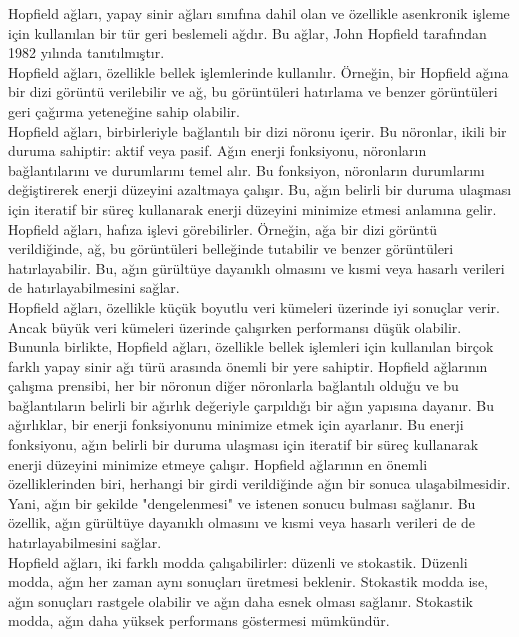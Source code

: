 \documentclass[11pt]{article}
\begin{document}
Hopfield ağları, yapay sinir ağları sınıfına dahil olan ve özellikle asenkronik işleme için kullanılan bir tür geri beslemeli ağdır. Bu ağlar, John Hopfield tarafından 1982 yılında tanıtılmıştır.\\
Hopfield ağları, özellikle bellek işlemlerinde kullanılır. Örneğin, bir Hopfield ağına bir dizi görüntü verilebilir ve ağ, bu görüntüleri hatırlama ve benzer görüntüleri geri çağırma yeteneğine sahip olabilir.\\
Hopfield ağları, birbirleriyle bağlantılı bir dizi nöronu içerir. Bu nöronlar, ikili bir duruma sahiptir: aktif veya pasif. Ağın enerji fonksiyonu, nöronların bağlantılarını ve durumlarını temel alır. Bu fonksiyon, nöronların durumlarını değiştirerek enerji düzeyini azaltmaya çalışır. Bu, ağın belirli bir duruma ulaşması için iteratif bir süreç kullanarak enerji düzeyini minimize etmesi anlamına gelir.\\
Hopfield ağları, hafıza işlevi görebilirler. Örneğin, ağa bir dizi görüntü verildiğinde, ağ, bu görüntüleri belleğinde tutabilir ve benzer görüntüleri hatırlayabilir. Bu, ağın gürültüye dayanıklı olmasını ve kısmi veya hasarlı verileri de hatırlayabilmesini sağlar.\\
Hopfield ağları, özellikle küçük boyutlu veri kümeleri üzerinde iyi sonuçlar verir. Ancak büyük veri kümeleri üzerinde çalışırken performansı düşük olabilir. Bununla birlikte, Hopfield ağları, özellikle bellek işlemleri için kullanılan birçok farklı yapay sinir ağı türü arasında önemli bir yere sahiptir.
Hopfield ağlarının çalışma prensibi, her bir nöronun diğer nöronlarla bağlantılı olduğu ve bu bağlantıların belirli bir ağırlık değeriyle çarpıldığı bir ağın yapısına dayanır. Bu ağırlıklar, bir enerji fonksiyonunu minimize etmek için ayarlanır. Bu enerji fonksiyonu, ağın belirli bir duruma ulaşması için iteratif bir süreç kullanarak enerji düzeyini minimize etmeye çalışır.
Hopfield ağlarının en önemli özelliklerinden biri, herhangi bir girdi verildiğinde ağın bir sonuca ulaşabilmesidir. Yani, ağın bir şekilde "dengelenmesi" ve istenen sonucu bulması sağlanır. Bu özellik, ağın gürültüye dayanıklı olmasını ve kısmi veya hasarlı verileri de de hatırlayabilmesini sağlar.\\
Hopfield ağları, iki farklı modda çalışabilirler: düzenli ve stokastik. Düzenli modda, ağın her zaman aynı sonuçları üretmesi beklenir. Stokastik modda ise, ağın sonuçları rastgele olabilir ve ağın daha esnek olması sağlanır. Stokastik modda, ağın daha yüksek performans göstermesi mümkündür.\\
\end{document}
